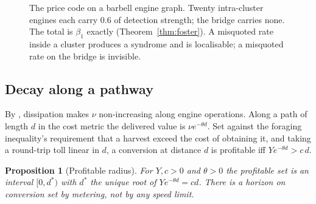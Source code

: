 \documentclass[11pt]{article}
\theoremstyle{plain}
\newtheorem{proposition}[theorem]{Proposition}
\theoremstyle{definition}
\theoremstyle{remark}
\newcommand{\Reff}{R_{\mathrm{eff}}}
\newcommand{\bt}{\beta_1}
\begin{document}
\begin{figure}[t]
\centering
{}
\caption{The price code on a barbell engine graph. Twenty intra-cluster
engines each carry $0.6$ of detection strength; the bridge carries none.
The total is $\bt$ exactly (Theorem~\ref{thm:foster}). A misquoted rate
inside a cluster produces a syndrome and is localisable; a misquoted rate
on the bridge is invisible.}
\label{fig:barbell}
\end{figure}

\subsection{Decay along a pathway}
\label{sec:decay}

By \cite[Prop.~6.1]{vtok}, dissipation makes $\nu$ non-increasing along
engine operations. Along a path of length $d$ in the cost metric the
delivered value is $\nu e^{-\theta d}$. Set against the foraging
inequality's requirement that a harvest exceed the cost of obtaining it,
and taking a round-trip toll linear in $d$, a conversion at distance $d$ is
profitable iff $Y e^{-\theta d} > c\,d$.

\begin{proposition}[Profitable radius]\label{prop:radius}
For $Y, c > 0$ and $\theta > 0$ the profitable set is an interval
$[0, d^\ast)$ with $d^\ast$ the unique root of $Y e^{-\theta d} = cd$.
There is a horizon on conversion set by metering, not by any speed limit.
\end{proposition}
\end{document}
